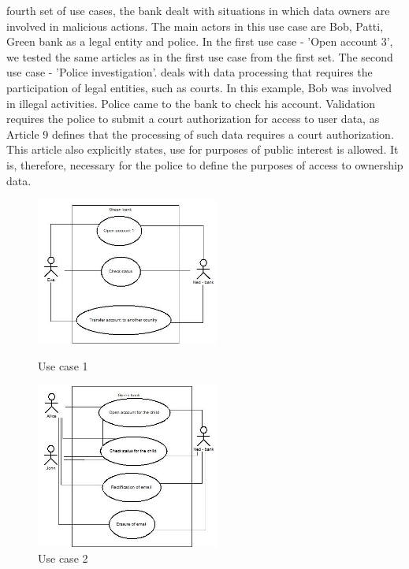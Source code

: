 \documentclass[11pt,english]{article}
\begin{document}
fourth set of use cases, the bank dealt with situations in which data owners are involved in malicious actions. The main actors in this use case are Bob, Patti, Green bank as a legal entity and police. In the first use case - 'Open account 3', we tested the same articles as in the first use case from the first set. The second use case - 'Police investigation'. deals with data processing that requires the participation of legal entities, such as courts. In this example, Bob was involved in illegal activities. Police came to the bank to check his account. Validation requires the police to submit a court authorization for access to user data, as Article 9 defines that the processing of such data requires a court authorization. This article also explicitly states, use for purposes of public interest is allowed. It is, therefore, necessary for the police to define the purposes of access to ownership data.
\begin{figure}[H]
\centering
\begin{minipage}{.5\textwidth}
  \centering
  \includegraphics[width=6cm,scale=0.5]{images/use case1.jpg}
  \caption{Use case 1}
  \label{fig:usecase1}
\end{minipage}%
\begin{minipage}{.5\textwidth}
  \centering
  \includegraphics[width=6cm,scale=0.5]{images/use case2.jpg}
  \caption{Use case 2}
  \label{fig:usecase2}
\end{minipage}
\end{figure}
\end{document}
